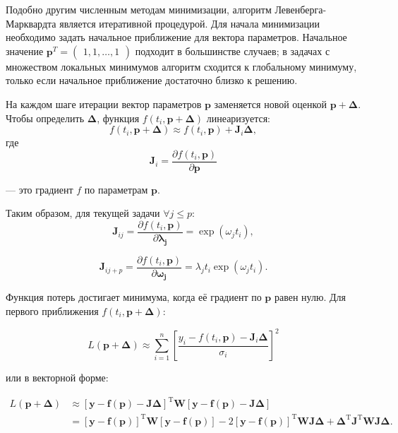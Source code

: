 Подобно другим численным методам минимизации, алгоритм Левенберга-Марквардта является итеративной процедурой. Для начала минимизации необходимо задать начальное приближение для вектора параметров. Начальное значение $\textbf{p}^T=\begin{pmatrix}1, 1, \dots, 1\end{pmatrix}$ подходит в большинстве случаев; в задачах с множеством локальных минимумов алгоритм сходится к глобальному минимуму, только если начальное приближение достаточно близко к решению.

На каждом шаге итерации вектор параметров $\textbf{p}$ заменяется новой оценкой $\textbf{p}+\boldsymbol{\Delta}$. Чтобы определить $\boldsymbol{\Delta}$, функция $f(t_i, \textbf{p} + \boldsymbol{\Delta})$ линеаризуется:
$$
	f(t_i, \textbf{p} + \boldsymbol{\Delta})\approx f(t_i, \textbf{p})+\mathbf{J}_i\boldsymbol{\Delta},
$$
где
\[
	\mathbf{J}_i = \frac{\partial f\left (t_i,  \mathbf{p}\right )}{\partial  \mathbf{p}}
\]

— это градиент $f$ по параметрам $\mathbf{p}$.

Таким образом, для текущей задачи $\forall j\le p:$
$$
	\mathbf{J}_{ij}=\frac{\partial f\left (t_i,  \mathbf{p}\right )}{\partial  \mathbf{\lambda_j}} = \exp(\omega_jt_i),
$$

$$
	\mathbf{J}_{ij+p}=\frac{\partial f\left (t_i,  \mathbf{p}\right )}{\partial  \mathbf{\omega_j}} = \lambda_jt_i\exp(\omega_jt_i).
$$

Функция потерь достигает минимума, когда её градиент по $\textbf{p}$ равен нулю. Для первого приближения $f\left (t_i,  \mathbf{p} + \boldsymbol\Delta\right )$:

$$
	L\left ( \mathbf{p} + \boldsymbol\Delta\right ) \approx \sum_{i=1}^n \left [\frac{y_i - f\left (t_i,  \mathbf{p}\right ) - \mathbf J_i \boldsymbol\Delta}{\sigma_i}\right ]^2
$$

или в векторной форме:

$$
	\begin{aligned}
		L\left ( \mathbf{p} + \boldsymbol\Delta\right ) & \approx \left [\mathbf y - \mathbf f\left ( \mathbf{p}\right ) - \mathbf J\boldsymbol\Delta \right ]^{\mathrm T}\boldsymbol{W}\left [\mathbf y - \mathbf f\left ( \mathbf{p}\right ) - \mathbf J\boldsymbol\Delta\right ]                                                                                                                                                              \\
		                                                & = \left [\mathbf y - \mathbf f\left ( \mathbf{p}\right )\right ]^{\mathrm T}\boldsymbol{W}\left [\mathbf y - \mathbf f\left ( \mathbf{p}\right )\right ] - 2\left [\mathbf y - \mathbf f\left ( \mathbf{p}\right )\right ]^{\mathrm T}\boldsymbol{W} \mathbf J\boldsymbol{\Delta} + \boldsymbol{\Delta}^{\mathrm T} \mathbf J^{\mathrm T} \boldsymbol{W} \mathbf J\boldsymbol{\Delta}.
	\end{aligned}
$$

